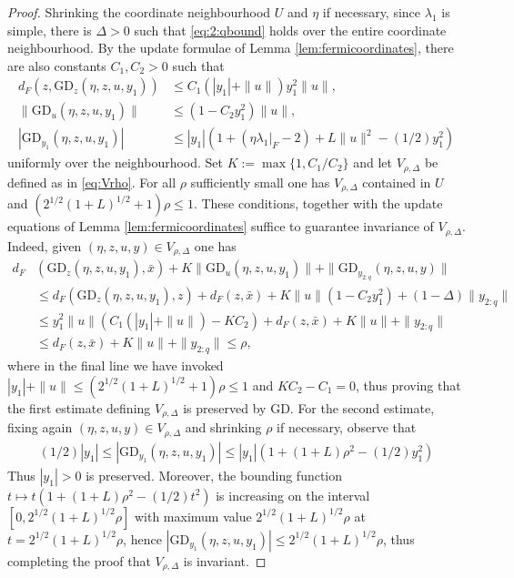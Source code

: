 \documentclass{article}
\newcommand{\GD}{\mathrm{GD}}
\theoremstyle{plain}
\theoremstyle{definition}
\theoremstyle{remark}
\begin{document}
\begin{proof}
Shrinking the coordinate neighbourhood $U$ and $\eta$ if necessary, since $\lambda_1$ is simple, there is $\Delta>0$ such that \eqref{eq:2:qbound} holds over the entire coordinate neighbourhood. By the update formulae of Lemma \ref{lem:fermicoordinates}, there are also constants $C_1,C_2>0$ such that
\begin{align}
    d_F(z,\GD_z(\eta,z,u,y_1))&\leq C_1(|y_1|+\|u\|)y_1^2\|u\|,\\
    \|\GD_u(\eta,z,u,y_1)\|&\leq (1-C_2y_1^2)\|u\|,\\
    |\GD_{y_1}(\eta,z,u,y_1)|&\leq |y_1|(1+(\eta\lambda_1|_F-2) + L\|u\|^2-(1/2)y_1^2)
\end{align}
uniformly over the neighbourhood. Set $K:=\max\{1,C_1/C_2\}$ and let $V_{\rho,\Delta}$ be defined as in \eqref{eq:Vrho}. For all $\rho$ sufficiently small one has $V_{\rho,\Delta}$ contained in $U$ and $(2^{1/2}(1+L)^{1/2}+1)\rho\leq 1$. These conditions, together with the update equations of Lemma \ref{lem:fermicoordinates} suffice to guarantee invariance of $V_{\rho,\Delta}$. Indeed, given $(\eta,z,u,y)\in V_{\rho,\Delta}$ one has
\begin{align}
d_F&(\GD_z(\eta,z,u,y_1),\bar{x}) + K\|\GD_u(\eta,z,u,y_1)\| + \|\GD_{y_{2:q}}(\eta,z,u,y)\|\\&\leq d_F(\GD_z(\eta,z,u,y_1),z) + d_F(z,\bar{x}) + K\|u\|(1-C_2y_1^2) + (1-\Delta)\|y_{2:q}\|\\&\leq y_1^2\|u\|(C_1(|y_1| + \|u\|) - KC_2) + d_F(z,\bar{x}) + K\|u\| + \|y_{2:q}\|\\&\leq d_F(z,\bar{x}) + K\|u\| + \|y_{2:q}\|\leq \rho,
\end{align}
where in the final line we have invoked $|y_1|+\|u\|\leq (2^{1/2}(1+L)^{1/2}+1)\rho\leq 1$ and $KC_2-C_1 = 0$, thus proving that the first estimate defining $V_{\rho,\Delta}$ is preserved by $\GD$. For the second estimate, fixing again $(\eta,z,u,y)\in V_{\rho,\Delta}$ and shrinking $\rho$ if necessary, observe that
\begin{align}
(1/2)|y_1|\leq |\GD_{y_1}(\eta,z,u,y_1)|\leq |y_1|(1+(1+L)\rho^2 - (1/2)y_1^2)
\end{align}
Thus $|y_1|>0$ is preserved. Moreover, the bounding function $t\mapsto t(1+(1+L)\rho^2-(1/2)t^2)$ is increasing on the interval $[0,2^{1/2}(1+L)^{1/2}\rho]$ with maximum value $2^{1/2}(1+L)^{1/2}\rho$ at $t = 2^{1/2}(1+L)^{1/2}\rho$, hence $|\GD_{y_1}(\eta,z,u,y_1)|\leq 2^{1/2}(1+L)^{1/2}\rho$, thus completing the proof that $V_{\rho,\Delta}$ is invariant.
\end{proof}
\end{document}
